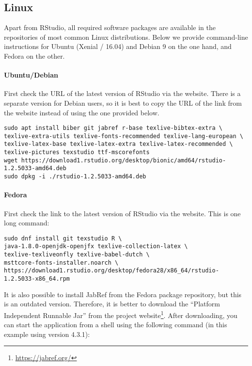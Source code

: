 \subsection{Linux}
\label{ssec:installatie-linux}

Apart from RStudio, all required software packages are available in the repositories of most common Linux distributions. Below we provide command-line instructions for Ubuntu (Xenial / 16.04) and Debian 9 on the one hand, and Fedora on the other.

\paragraph{Ubuntu/Debian} 

First check the URL of the latest version of RStudio via the website. There is a separate version for Debian users, so it is best to copy the URL of the link from the website instead of using the one provided below.

\begin{verbatim}
sudo apt install biber git jabref r-base texlive-bibtex-extra \
texlive-extra-utils texlive-fonts-recommended texlive-lang-european \
texlive-latex-base texlive-latex-extra texlive-latex-recommended \
texlive-pictures texstudio ttf-mscorefonts
wget https://download1.rstudio.org/desktop/bionic/amd64/rstudio-1.2.5033-amd64.deb
sudo dpkg -i ./rstudio-1.2.5033-amd64.deb
\end{verbatim}

\paragraph{Fedora}

First check the link to the latest version of RStudio via the website. This is one long command:

\begin{verbatim}
sudo dnf install git texstudio R \
java-1.8.0-openjdk-openjfx texlive-collection-latex \
texlive-texliveonfly texlive-babel-dutch \
msttcore-fonts-installer.noarch \
https://download1.rstudio.org/desktop/fedora28/x86_64/rstudio-1.2.5033-x86_64.rpm
\end{verbatim}

It is also possible to install JabRef from the Fedora package repository, but this is an outdated version. Therefore, it is better to download the ``Platform Independent Runnable Jar'' from the project website\footnote{\url{https://jabref.org/}}. After downloading, you can start the application from a shell using the following command (in this example using version 4.3.1):


